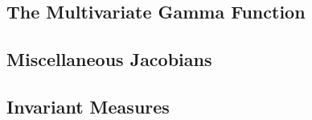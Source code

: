 \documentclass{article}
\theoremstyle{definition}
\begin{document}
\subsection{The Multivariate Gamma Function}

\subsection{Miscellaneous Jacobians}

\subsection{Invariant Measures}
\end{document}
